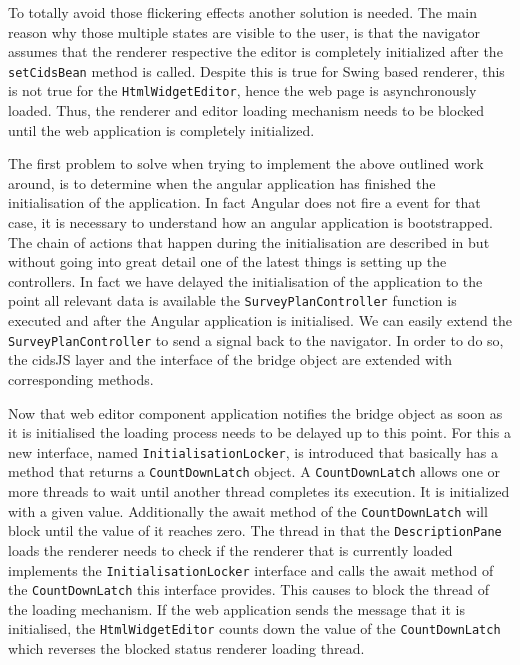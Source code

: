 To totally avoid those flickering effects another solution is needed. 
The main reason why those multiple states are visible to the user, is that the navigator assumes that the renderer respective the editor is completely initialized after the \texttt{setCidsBean} method is called. 
Despite this is true for Swing based renderer, this is not true for the \texttt{HtmlWidgetEditor}, hence the web page is asynchronously loaded. 
Thus, the renderer and editor loading mechanism needs to be blocked until the web application is completely initialized. 

The first problem to solve when trying to implement the above outlined work around, is to determine when the angular application has finished the initialisation of the application. 
In fact Angular does not fire a event for that case, it is necessary to understand how an angular application is bootstrapped. 
The chain of actions that happen during the initialisation are described in \autocite{impl:ng-bootstrap} but without going into great detail one of the latest things is setting up the controllers. 
In fact we have delayed the initialisation of the application to the point all relevant data is available the \texttt{SurveyPlanController} function is executed and after the Angular application is initialised. We can easily extend the \texttt{SurveyPlanController} to send a signal back to the navigator. 
In order to do so, the cidsJS layer and the interface of the bridge object are extended with corresponding methods.

Now that web editor component application notifies the bridge object as soon as it is initialised the loading process needs to be delayed up to this point. 
For this a new interface, named \texttt{InitialisationLocker}, is introduced that basically has a method that returns a \texttt{CountDownLatch} object. 
A \texttt{CountDownLatch} allows one or more threads to wait until another thread completes its execution. 
It is initialized with a given value. Additionally the await  method of the \texttt{CountDownLatch} will block until the value of it reaches zero. 
The thread in that the \texttt{DescriptionPane} loads the renderer needs to check if the renderer  that is currently loaded implements the \texttt{InitialisationLocker} interface and calls the await method of the \texttt{CountDownLatch} this interface provides. 
This causes to block the thread of the loading mechanism. 
If the web application sends the message that it is initialised, the \texttt{HtmlWidgetEditor} counts down the value of the \texttt{CountDownLatch} which reverses the blocked status renderer loading thread. 

